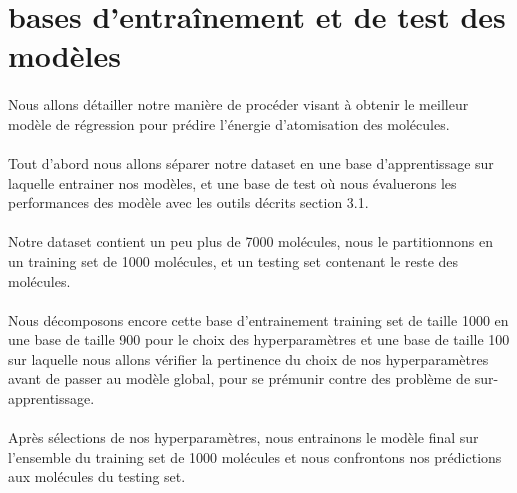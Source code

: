 \documentclass[a4paper,12pt,titlepage]{report}
\begin{document}
\section{bases d'entraînement et de test des modèles}

\paragraph{}
Nous allons détailler notre manière de procéder visant à obtenir le meilleur modèle de régression pour prédire l'énergie d'atomisation des molécules.

\paragraph{}
Tout d'abord nous allons séparer notre dataset en une base d'apprentissage sur laquelle entrainer nos modèles, et une base de test où nous évaluerons les performances des modèle avec les outils décrits section 3.1. 
\paragraph{}
Notre dataset contient un peu plus de 7000 molécules, nous le partitionnons  en un training set de 1000 molécules, et un testing set contenant le reste des molécules.
\paragraph{}
Nous décomposons encore cette base d'entrainement training set de taille 1000 en une base de taille 900 pour le choix des hyperparamètres et une base de taille 100 sur laquelle nous allons vérifier la pertinence du choix de nos hyperparamètres avant de passer au modèle global, pour se prémunir contre des problème de sur-apprentissage.
\paragraph{}
Après sélections de nos hyperparamètres, nous entrainons le modèle final sur l'ensemble du training set de 1000 molécules et nous confrontons nos prédictions aux molécules du testing set.
\end{document}
